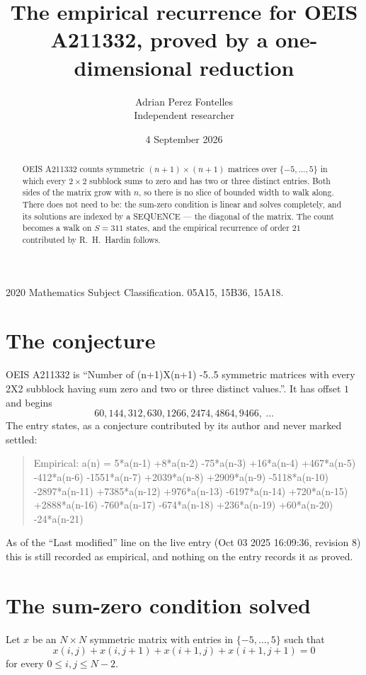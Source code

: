 \documentclass[11pt,a4paper]{article}
\title{The empirical recurrence for OEIS A211332, proved by a one-dimensional reduction}
\author{Adrian Perez Fontelles\\ \small Independent researcher}
\date{4 September 2026}
\theoremstyle{plain}
\theoremstyle{definition}
\begin{document}
\maketitle

\begin{abstract}
OEIS A211332 counts symmetric $(n+1)\times(n+1)$ matrices over
$\{-5,\dots,5\}$ in which every $2\times2$ subblock sums to zero and has two or three distinct
entries. Both sides of the matrix grow with $n$, so there is no slice of bounded width to walk
along. There does not need to be: the sum-zero condition is linear and solves completely, and
its solutions are indexed by a SEQUENCE --- the diagonal of the matrix. The count becomes a walk
on $S=311$ states, and the empirical recurrence of order $21$ contributed by R.~H.~Hardin
follows.
\end{abstract}

\noindent\small 2020 Mathematics Subject Classification. 05A15, 15B36, 15A18.\normalsize

\section{The conjecture}

OEIS A211332 is ``Number of (n+1)X(n+1) -5..5 symmetric matrices with every 2X2 subblock having sum zero and two or three distinct values.''. It has offset $1$ and begins
\[
60, 144, 312, 630, 1266, 2474, 4864, 9466,\ \dots
\]
The entry states, as a conjecture contributed by its author and never marked settled:
\begin{quote}
Empirical: a(n) = 5*a(n-1) +8*a(n-2) -75*a(n-3) +16*a(n-4) +467*a(n-5) -412*a(n-6) -1551*a(n-7) +2039*a(n-8) +2909*a(n-9) -5118*a(n-10) -2897*a(n-11) +7385*a(n-12) +976*a(n-13) -6197*a(n-14) +720*a(n-15) +2888*a(n-16) -760*a(n-17) -674*a(n-18) +236*a(n-19) +60*a(n-20) -24*a(n-21)
\end{quote}
As of the ``Last modified'' line on the live entry (Oct 03 2025 16:09:36, revision 8) this is still
recorded as empirical, and nothing on the entry records it as proved.

\section{The sum-zero condition solved}

Let $x$ be an $N\times N$ symmetric matrix with entries in $\{-5,\dots,5\}$ such that
\[
x(i,j)+x(i,j{+}1)+x(i{+}1,j)+x(i{+}1,j{+}1)=0
\]
for every $0\le i,j\le N-2$.
\end{document}
